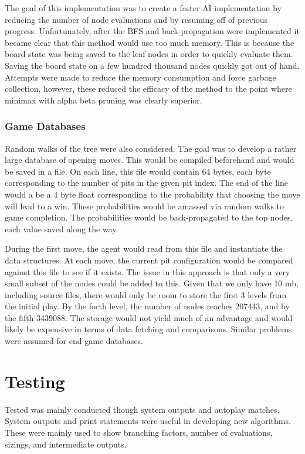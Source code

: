 \documentclass[]{article}
\begin{document}
The goal of this implementation was to create a faster AI implementation by reducing the number of node evaluations and by resuming off of previous progress. Unfortunately, after the BFS and back-propagation were implemented it became clear that this method would use too much memory. This is because the board state was being saved to the leaf nodes in order to quickly evaluate them. Saving the board state on a few hundred thousand nodes quickly got out of hand. Attempts were made to reduce the memory consumption and force garbage collection, however, these reduced the efficacy of the method to the point where minimax with alpha beta pruning was clearly superior. 


\subsubsection{Game Databases}
Random walks of the tree were also considered. The goal was to develop a rather large database of opening moves. This would be compiled beforehand and would be saved in a file. On each line, this file would contain 64 bytes, each byte corresponding to the number of pits in the given pit index. The end of the line would a be a 4 byte float corresponding to the probability that choosing the move will lead to a win. These probabilities would be amassed via random walks to game completion. The probabilities would be back-propagated to the top nodes, each value saved along the way. 

During the first move, the agent would read from this file and instantiate the data structures. At each move, the current pit configuration would be compared against this file to see if it exists. The issue in this approach is that only a very small subset of the nodes could be added to this. Given that we only have 10 mb, including source files, there would only be room to store the first 3 levels from the initial play. By the forth level, the number of nodes reaches 207443, and by the fifth 3439088. The storage would not yield much of an advantage and would likely be expensive in terms of data fetching and comparisons. Similar problems were assumed for end game databases. 


\section{Testing}
Tested was mainly conducted though system outputs and autoplay matches. System outputs and print statements were useful in developing new algorithms. These were mainly used to show branching factors, number of evaluations, sizings, and intermediate outputs. %
\end{document}
